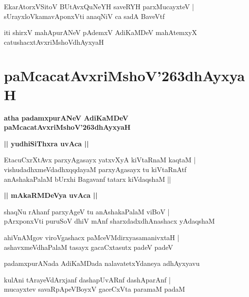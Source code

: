 \documentclass[twoside,12pt,openright]{book}
\def\S{\char'263}
\newcounter{shloka}[chapter]
\def\uvaca#1{\centerline{{\large\textbf{#1}}}}
\begin{document}
\begin{shloka}
EkarAtorxVSitoV BUtAvxQuNeYH saveRYH parxMucayxteV |\\
sUrayxloVkamavAponxVti anaqNiV ca sadA BaveVtf 
\end{shloka}

\begin{center}
iti shirxV mahApurANeV pAdemxV AdiKaMDeV mahAtemxyX catushacxtAvxriMshoVdhAyxyaH 
\end{center}

\chapter{paMcacatAvxriMshoV\S dhAyxyaH}

\begin{center}
{\LARGE\bfseries atha padamxpurANeV AdiKaMDeV paMcacatAvxriMshoV\S dhAyxyaH}
\end{center}

\uvaca{|| yudhiSiThxra uvAca ||}

\begin{shloka}
EtacuCxrXtAvx parxyAgasayx yatxvXyA kiVtaRnaM kaqtaM |\\
vishudadhxmeVdadhxqqdayaM parxyAgasayx tu kiVtaRnAtf \\
anAshakaPalaM bUrxhi Bagavanf tatarx kiVdaqshaM || 
\end{shloka}

\uvaca{|| mAkaRMDeVya uvAca ||}

\begin{shloka}
shaqNu rAhanf parxyAgeV tu anAshakaPalaM viBoV |\\
pArxponxVti puruSoV dhiV mAnf sharxdadxdhAnashacx yAdaqshaM 
\end{shloka}

\begin{shloka}
ahiVnAMgov viroVgashacx paMceVMdirxyasamanivxtaH |\\
ashavxmeVdhaPalaM tasayx gacaCxtasutx padeV padeV 
\end{shloka}

\begin{center}
padamxpurANada AdiKaMDada nalavatetxYdaneya adhAyxyavu
\end{center}

\begin{shloka}
kulAni tArayeVdArxjanf dashapUvARnf dashAparAnf |\\
mucayxtev savaRpApeVBoyxV gaceCxVta paramaM padaM 
\end{shloka}
\end{document}
